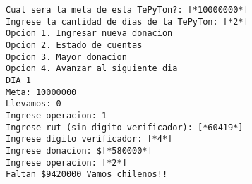 \begin{lstlisting}[style=consola]
Cual sera la meta de esta TePyTon?: [*10000000*]
Ingrese la cantidad de dias de la TePyTon: [*2*]
Opcion 1. Ingresar nueva donacion
Opcion 2. Estado de cuentas
Opcion 3. Mayor donacion
Opcion 4. Avanzar al siguiente dia
DIA 1
Meta: 10000000
Llevamos: 0
Ingrese operacion: 1
Ingrese rut (sin digito verificador): [*60419*]
Ingrese digito verificador: [*4*]
Ingrese donacion: $[*580000*]
Ingrese operacion: [*2*]
Faltan $9420000 Vamos chilenos!!
\end{lstlisting}